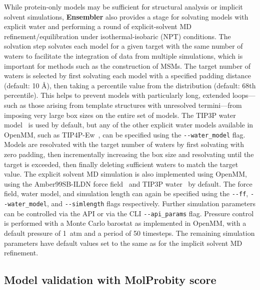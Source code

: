 \documentclass[10pt,letterpaper]{article}
\begin{document}
While protein-only models may be sufficient for structural analysis or implicit solvent simulations, {\bf Ensembler} also provides a stage for solvating models with explicit water and performing a round of explicit-solvent MD refinement/equilibration under isothermal-isobaric (NPT) conditions.
The solvation step solvates each model for a given target with the same number of waters to facilitate the integration of data from multiple simulations, which is important for methods such as the construction of MSMs.
The target number of waters is selected by first solvating each model with a specified padding distance (default: 10 \AA), then taking a percentile value from the distribution (default: 68th percentile).
This helps to prevent models with particularly long, extended loops---such as those arising from template structures with unresolved termini---from imposing very large box sizes on the entire set of models.
The TIP3P water model~\cite{tip3p} is used by default, but any of the other explicit water models available in OpenMM, such as TIP4P-Ew~\cite{tip4p-ew}, can be specified using the {\tt -{}-water\_model} flag.
Models are resolvated with the target number of waters by first solvating with zero padding, then incrementally increasing the box size and resolvating until the target is exceeded, then finally deleting sufficient waters to match the target value.
The explicit solvent MD simulation is also implemented using OpenMM, using the Amber99SB-ILDN force field~\cite{amber99sb-ildn} and TIP3P water~\cite{tip3p} by default.
The force field, water model, and simulation length can again be specified using the {\tt -{}-ff}, {\tt -{}-water\_model}, and {\tt -{}-simlength} flags respectively.
Further simulation parameters can be controlled via the API or via the CLI {\tt -{}-api\_params} flag.
Pressure control is performed with a Monte Carlo barostat as implemented in OpenMM, with a default pressure of 1~atm and a period of 50 timesteps.
The remaining simulation parameters have default values set to the same as for the implicit solvent MD refinement.

\subsection*{Model validation with MolProbity score}
\end{document}
